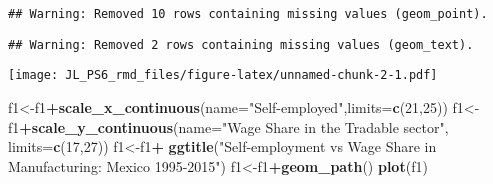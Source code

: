 \documentclass[
]{article}
\newenvironment{Shaded}{\begin{snugshade}}{\end{snugshade}}
\newcommand{\DataTypeTok}[1]{\textcolor[rgb]{0.13,0.29,0.53}{#1}}
\newcommand{\DecValTok}[1]{\textcolor[rgb]{0.00,0.00,0.81}{#1}}
\newcommand{\FloatTok}[1]{\textcolor[rgb]{0.00,0.00,0.81}{#1}}
\newcommand{\KeywordTok}[1]{\textcolor[rgb]{0.13,0.29,0.53}{\textbf{#1}}}
\newcommand{\NormalTok}[1]{#1}
\newcommand{\OperatorTok}[1]{\textcolor[rgb]{0.81,0.36,0.00}{\textbf{#1}}}
\newcommand{\StringTok}[1]{\textcolor[rgb]{0.31,0.60,0.02}{#1}}
\begin{document}
\begin{Shaded}
\end{Shaded}

\begin{verbatim}
## Warning: Removed 10 rows containing missing values (geom_point).
\end{verbatim}

\begin{verbatim}
## Warning: Removed 2 rows containing missing values (geom_text).
\end{verbatim}

\texttt{[image: JL\_PS6\_rmd\_files/figure-latex/unnamed-chunk-2-1.pdf]}

\begin{Shaded}
\begin{Highlighting}[]
\NormalTok{f1<-f1}\OperatorTok{+}\KeywordTok{scale_x_continuous}\NormalTok{(}\DataTypeTok{name=}\StringTok{"Self-employed"}\NormalTok{,}\DataTypeTok{limits=}\KeywordTok{c}\NormalTok{(}\DecValTok{21}\NormalTok{,}\DecValTok{25}\NormalTok{))}
\NormalTok{f1<-f1}\OperatorTok{+}\KeywordTok{scale_y_continuous}\NormalTok{(}\DataTypeTok{name=}\StringTok{"Wage Share in the Tradable sector"}\NormalTok{, }\DataTypeTok{limits=}\KeywordTok{c}\NormalTok{(}\DecValTok{17}\NormalTok{,}\DecValTok{27}\NormalTok{))}
\NormalTok{f1<-f1}\OperatorTok{+}\StringTok{ }\KeywordTok{ggtitle}\NormalTok{(}\StringTok{"Self-employment vs Wage Share in Manufacturing: Mexico 1995-2015"}\NormalTok{)}
\NormalTok{f1<-f1}\OperatorTok{+}\KeywordTok{geom_path}\NormalTok{()}
\KeywordTok{plot}\NormalTok{(f1)}
\end{Highlighting}
\end{Shaded}
\end{document}
